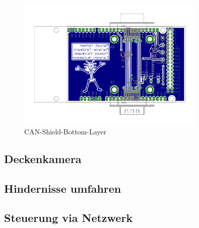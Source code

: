 \begin{figure}[H]
\centering
 \includegraphics[width=0.8\textwidth]{Abbildungen/CAN-Shield-Layout-Bottom} 
\caption[CAN-Shield-Bottom-Layer]{CAN-Shield-Bottom-Layer}
\label{fig:CAN-Shield-Layout-Bottom}
\end{figure}

\subsection{Deckenkamera}
\label{sec:Deckenkamera}

\subsection{Hindernisse umfahren}
\label{sec:Hindernisse}

\subsection{Steuerung via Netzwerk}
\label{sec:Netzwerk}
